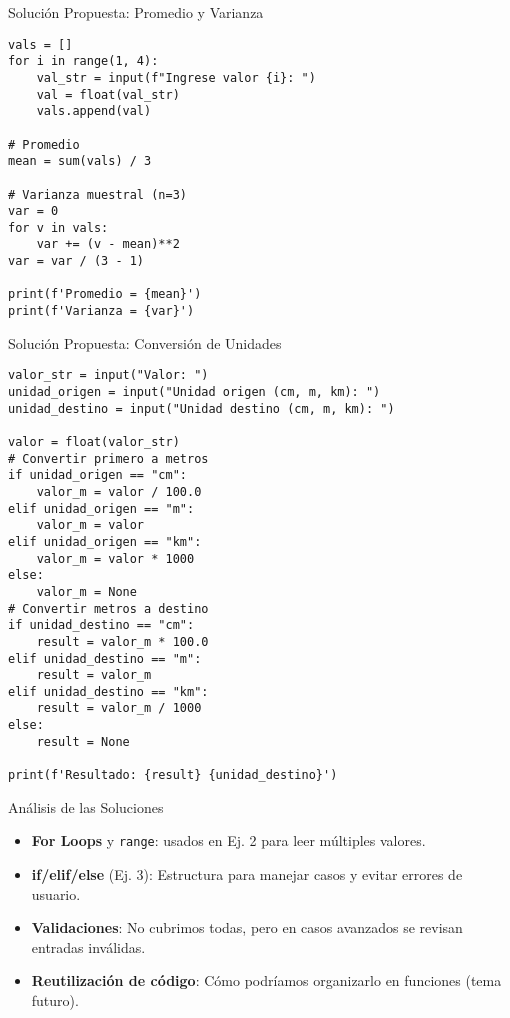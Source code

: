 \documentclass[10pt]{beamer}
\begin{document}
\begin{frame}[fragile]{Solución Propuesta: Promedio y Varianza}
\begin{verbatim}
vals = []
for i in range(1, 4):
    val_str = input(f"Ingrese valor {i}: ")
    val = float(val_str)
    vals.append(val)

# Promedio
mean = sum(vals) / 3

# Varianza muestral (n=3)
var = 0
for v in vals:
    var += (v - mean)**2
var = var / (3 - 1)

print(f'Promedio = {mean}')
print(f'Varianza = {var}')
\end{verbatim}
\end{frame}

\begin{frame}[fragile]{Solución Propuesta: Conversión de Unidades}
\begin{verbatim}
valor_str = input("Valor: ")
unidad_origen = input("Unidad origen (cm, m, km): ")
unidad_destino = input("Unidad destino (cm, m, km): ")

valor = float(valor_str)
# Convertir primero a metros
if unidad_origen == "cm":
    valor_m = valor / 100.0
elif unidad_origen == "m":
    valor_m = valor
elif unidad_origen == "km":
    valor_m = valor * 1000
else:
    valor_m = None
# Convertir metros a destino
if unidad_destino == "cm":
    result = valor_m * 100.0
elif unidad_destino == "m":
    result = valor_m
elif unidad_destino == "km":
    result = valor_m / 1000
else:
    result = None

print(f'Resultado: {result} {unidad_destino}')
\end{verbatim}
\end{frame}

\begin{frame}{Análisis de las Soluciones}
  \begin{itemize}
    \item \textbf{For Loops} y \texttt{range}: usados en Ej. 2 para leer múltiples valores.
    \item \textbf{if/elif/else} (Ej. 3): Estructura para manejar casos y evitar errores de usuario.
    \item \textbf{Validaciones}: No cubrimos todas, pero en casos avanzados se revisan entradas inválidas.
    \item \textbf{Reutilización de código}: Cómo podríamos organizarlo en funciones (tema futuro).
  \end{itemize}
\end{frame}
\end{document}
